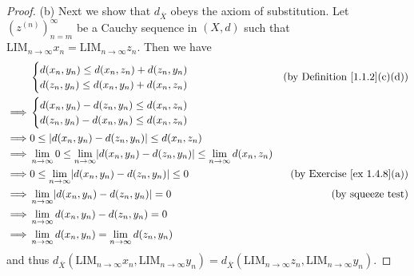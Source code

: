 \begin{proof}{(b)}
    Next we show that \(d_{\overline{X}}\) obeys the axiom of substitution.
    Let \((z^{(n)})_{n = m}^\infty\) be a Cauchy sequence in \((X, d)\) such that \(\text{LIM}_{n \to \infty} x_n = \text{LIM}_{n \to \infty} z_n\).
    Then we have
    \begin{align*}
                 & \begin{cases}
            d(x_n, y_n) \leq d(x_n, z_n) + d(z_n, y_n) \\
            d(z_n, y_n) \leq d(x_n, y_n) + d(x_n, z_n)
        \end{cases}                                                                                           & \text{(by Definition \ref{1.1.2}(c)(d))} \\
        \implies & \begin{cases}
            d(x_n, y_n) - d(z_n, y_n) \leq d(x_n, z_n) \\
            d(z_n, y_n) - d(x_n, y_n) \leq d(x_n, z_n)
        \end{cases}                                                                                                                                      \\
        \implies & 0 \leq \abs*{d(x_n, y_n) - d(z_n, y_n)} \leq d(x_n, z_n)                                                                                                        \\
        \implies & \lim_{n \to \infty} 0 \leq \lim_{n \to \infty} \abs*{d(x_n, y_n) - d(z_n, y_n)} \leq \lim_{n \to \infty} d(x_n, z_n)                                            \\
        \implies & 0 \leq \lim_{n \to \infty} \abs*{d(x_n, y_n) - d(z_n, y_n)} \leq 0                                                   & \text{(by Exercise \ref{ex 1.4.8}(a))}   \\
        \implies & \lim_{n \to \infty} \abs*{d(x_n, y_n) - d(z_n, y_n)} = 0                                                             & \text{(by squeeze test)}                 \\
        \implies & \lim_{n \to \infty} d(x_n, y_n) - d(z_n, y_n) = 0                                                                                                               \\
        \implies & \lim_{n \to \infty} d(x_n, y_n) = \lim_{n \to \infty} d(z_n, y_n)
    \end{align*}
    and thus \(d_{\overline{X}}(\text{LIM}_{n \to \infty} x_n, \text{LIM}_{n \to \infty} y_n) = d_{\overline{X}}(\text{LIM}_{n \to \infty} z_n, \text{LIM}_{n \to \infty} y_n)\).


\end{proof}
